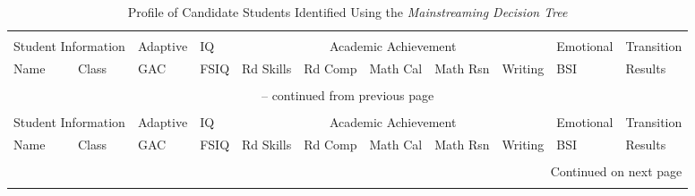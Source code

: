 \documentclass[twoside]{article}
\begin{document}
\begin{tiny}
	\begin{landscape}
		\setlength\LTleft{-1.5in}
		\setlength{}
		\begin{longtable}{p{1.5cm}p{1.5cm}p{1.5cm}p{1.5cm}p{1.75cm}p{1.75cm}p{1.75cm}p{1.75cm}p{1.75cm}p{1.75cm}p{2.5cm}@{}}
			
			\captionsetup{font=tiny}
			\caption{Profile of Candidate Students Identified Using the \textit{Mainstreaming Decision Tree}\label{tab4}}
			\\
			\multicolumn{2}{c}{Student Information} & Adaptive & IQ & \multicolumn{5}{c}{Academic Achievement} & Emotional & Transition\\
			\cmidrule(lr){1-2}
			\cmidrule(lr){5-9}
			Name & Class & GAC & FSIQ & Rd Skills & Rd Comp & Math Cal & Math Rsn & Writing & BSI & Results\\
			\hline\\
			\endfirsthead
			\multicolumn{11}{c}{-- continued from previous page} \\ \\
			\multicolumn{2}{c}{Student Information} & Adaptive & IQ & \multicolumn{5}{c}{Academic Achievement} & Emotional & Transition\\
			\cmidrule(lr){1-2}
			\cmidrule(lr){5-9}
			Name & Class & GAC & FSIQ & Rd Skills & Rd Comp & Math Cal & Math Rsn & Writing & BSI & Results\\
			\hline\\
			\endhead
			\hline \multicolumn{11}{r}{{Continued on next page}} \\ \hline
			\endfoot
			\hline \hline
			\endlastfoot
			

\end{longtable}
\end{landscape}
\end{tiny}
\end{document}
